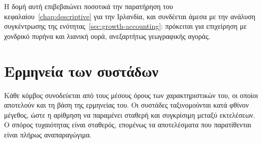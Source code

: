 Η δομή αυτή επιβεβαιώνει ποσοτικά την παρατήρηση του
κεφαλαίου~\ref{chap:descriptive} για την Ιρλανδία, και συνδέεται άμεσα με την
ανάλυση συγκέντρωσης της ενότητας~\ref{sec:growth-accounting}: πρόκειται για
επιχείρηση με χονδρικό πυρήνα και λιανική ουρά, ανεξαρτήτως γεωγραφικής αγοράς.

\section{Ερμηνεία των συστάδων}

Κάθε κόμβος συνοδεύεται από τους μέσους όρους των χαρακτηριστικών του, οι
οποίοι αποτελούν και τη βάση της ερμηνείας του. Οι συστάδες ταξινομούνται κατά
φθίνον μέγεθος, ώστε η αρίθμηση να παραμένει σταθερή και συγκρίσιμη μεταξύ
εκτελέσεων. Ο σπόρος τυχαιότητας είναι σταθερός, επομένως τα αποτελέσματα που
παρατίθενται είναι πλήρως αναπαραγώγιμα.

